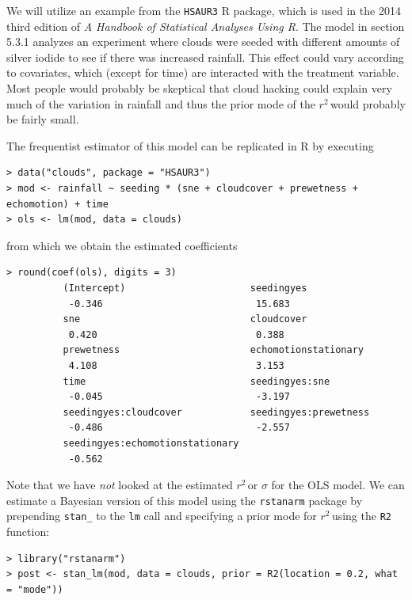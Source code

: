 \documentclass[11pt]{article}
\newcommand{\Rsq}{$r^2\,$}
\begin{document}

We will utilize an example from the {\tt HSAUR3} R package, which is used in the
2014 third edition of \emph{A Handbook of Statistical Analyses Using R}.
The model in section 5.3.1 analyzes an experiment where clouds were seeded
with different amounts of silver iodide to see if there was increased rainfall.
This effect could vary according to covariates, which (except for time) are
interacted with the treatment variable. Most people would probably be skeptical
that cloud hacking could explain very much of the variation in rainfall and
thus the prior mode of the \Rsq would probably be fairly small.

The frequentist estimator of this model can be replicated in R by executing

\begin{lstlisting}
> data("clouds", package = "HSAUR3")
> mod <- rainfall ~ seeding * (sne + cloudcover + prewetness + echomotion) + time
> ols <- lm(mod, data = clouds)
\end{lstlisting}

from which we obtain the estimated coefficients

\begin{lstlisting}
> round(coef(ols), digits = 3)
          (Intercept)                      seedingyes
           -0.346                           15.683
          sne                              cloudcover
           0.420                            0.388
          prewetness                       echomotionstationary
           4.108                            3.153
          time                             seedingyes:sne
           -0.045                           -3.197
          seedingyes:cloudcover            seedingyes:prewetness
           -0.486                           -2.557
          seedingyes:echomotionstationary
           -0.562
\end{lstlisting}

Note that we have \emph{not} looked at the estimated \Rsq or $\sigma$ for the
OLS model. We can estimate a Bayesian version of this model using the
{\tt rstanarm} package by prepending {\tt stan\_} to the {\tt lm} call and
specifying a prior mode for \Rsq using the {\tt R2} function:

\begin{lstlisting}
> library("rstanarm")
> post <- stan_lm(mod, data = clouds, prior = R2(location = 0.2, what = "mode"))
\end{lstlisting}
\end{document}
